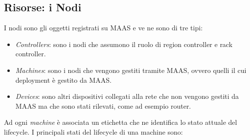 \subsection{Risorse: i Nodi}\label{subsubsec:maas_node}
I nodi sono gli oggetti registrati su MAAS e ve ne sono di tre tipi:
\begin{itemize}
    \item \emph{Controllers}: sono i nodi che assumono il ruolo di region controller e rack controller.

    \item \emph{Machines}: sono i nodi che vengono gestiti tramite MAAS, ovvero quelli il cui deployment è gestito da MAAS.

    \item \emph{Devices}: sono altri dispositivi collegati alla rete che non vengono gestiti da MAAS ma che sono stati rilevati, come ad esempio router.
\end{itemize}
%
Ad ogni \textit{machine} è associata un etichetta che ne identifica lo stato attuale del lifecycle.
% 
I principali stati del lifecycle di una machine sono:

